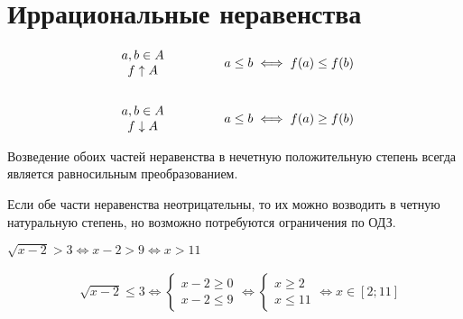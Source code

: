\section{Иррациональные неравенства}

\begin{align*}
    \begin{array}{c}
        a, b \in A \\
        f \uparrow A
    \end{array}
    \hspace{1.5cm}
    a \le b \iff f(a) \le f(b) \\ \\
    \begin{array}{c}
        a, b \in A \\
        f \downarrow A
    \end{array}
    \hspace{1.5cm}
    a \le b \iff f(a) \ge f(b) \\
\end{align*}

\begin{remark}
    Возведение обоих частей неравенства в нечетную положительную степень всегда является равносильным преобразованием.
\end{remark}

\begin{remark}
    Если обе части неравенства неотрицательны, то их можно возводить в четную натуральную степень, но возможно потребуются ограничения по ОДЗ.
\end{remark}

\begin{example}
    $\sqrt{x - 2} > 3 \iff x - 2 > 9 \iff x > 11$
\end{example}

\begin{example}
    \begin{align*}
        &\sqrt{x - 2} \le 3 \iff
        \left\{\begin{array}{l}
            x - 2 \ge 0 \\
            x - 2  \le 9
        \end{array}\right. \iff
        \left\{\begin{array}{l}
            x \ge 2 \\
            x \le 11
        \end{array}\right. \iff
        x \in [2; 11]
    \end{align*}
\end{example}

